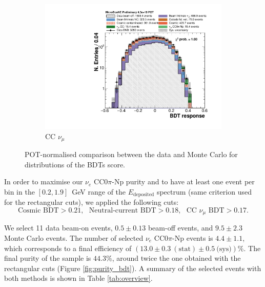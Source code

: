 \begin{figure}[htbp]
\begin{subfigure}{0.32\textwidth}
    \includegraphics[width=\linewidth]{figures/bdt_numu.pdf}
    \caption{CC $\nu_{\mu}$} 
  \end{subfigure}
  \caption{POT-normalised comparison between the data and Monte Carlo for distributions of the BDTs score.}\label{fig:bdt_datamc}
\end{figure}

In order to maximise our $\nu_e$ CC0$\pi$-Np purity and to have at least one event per bin in the $[0.2,1.9]$~GeV range of the $E_{\mathrm{deposited}}$ spectrum (same criterion used for the rectangular cuts), we applied the following cuts:
\begin{equation}
    \text{Cosmic BDT} > 0.21,~~~\text{Neutral-current BDT} > 0.18,~~~\text{CC }\nu_{\mu}\text{ BDT} > 0.17.
\end{equation}

We select 11 data beam-on events, $0.5\pm0.13$ beam-off events, and $9.5\pm2.3$ Monte Carlo events. The number of selected $\nu_e$ CC0$\pi$-Np events is $4.4\pm1.1$, which corresponds to a final efficiency of $(13.0\pm0.3~\mathrm{(stat)}\pm0.5~\text{(sys)})\%$. The final purity of the sample is $44.3\%$, around twice the one obtained with the rectangular cuts (Figure \ref{fig:purity_bdt}).
A summary of the selected events with both methods is shown in Table \ref{tab:overview}.

